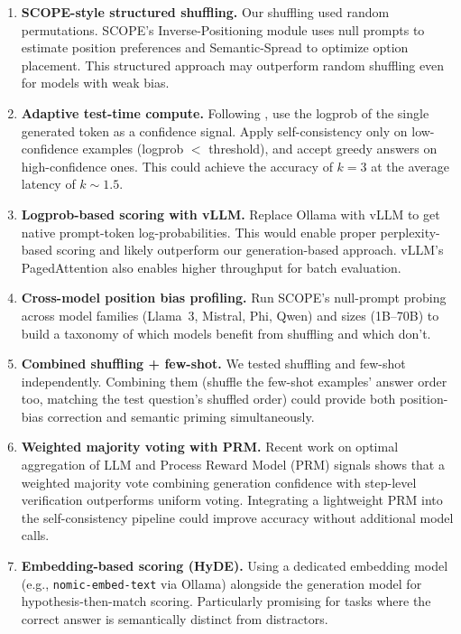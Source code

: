 \documentclass[11pt]{article}
\begin{document}
\begin{enumerate}
    \item \textbf{SCOPE-style structured shuffling.} Our shuffling used random permutations. SCOPE's Inverse-Positioning module uses null prompts to estimate position preferences and Semantic-Spread to optimize option placement. This structured approach may outperform random shuffling even for models with weak bias.

    \item \textbf{Adaptive test-time compute.} Following \citet{snell2024}, use the logprob of the single generated token as a confidence signal. Apply self-consistency only on low-confidence examples (logprob $<$ threshold), and accept greedy answers on high-confidence ones. This could achieve the accuracy of $k{=}3$ at the average latency of $k{\sim}1.5$.

    \item \textbf{Logprob-based scoring with vLLM.} Replace Ollama with vLLM to get native prompt-token log-probabilities. This would enable proper perplexity-based scoring and likely outperform our generation-based approach. vLLM's PagedAttention also enables higher throughput for batch evaluation.

    \item \textbf{Cross-model position bias profiling.} Run SCOPE's null-prompt probing across model families (Llama~3, Mistral, Phi, Qwen) and sizes (1B--70B) to build a taxonomy of which models benefit from shuffling and which don't.

    \item \textbf{Combined shuffling + few-shot.} We tested shuffling and few-shot independently. Combining them (shuffle the few-shot examples' answer order too, matching the test question's shuffled order) could provide both position-bias correction and semantic priming simultaneously.

    \item \textbf{Weighted majority voting with PRM.} Recent work on optimal aggregation of LLM and Process Reward Model (PRM) signals shows that a weighted majority vote combining generation confidence with step-level verification outperforms uniform voting. Integrating a lightweight PRM into the self-consistency pipeline could improve accuracy without additional model calls.

    \item \textbf{Embedding-based scoring (HyDE).} Using a dedicated embedding model (e.g., \texttt{nomic-embed-text} via Ollama) alongside the generation model for hypothesis-then-match scoring. Particularly promising for tasks where the correct answer is semantically distinct from distractors.
\end{enumerate}
\end{document}
